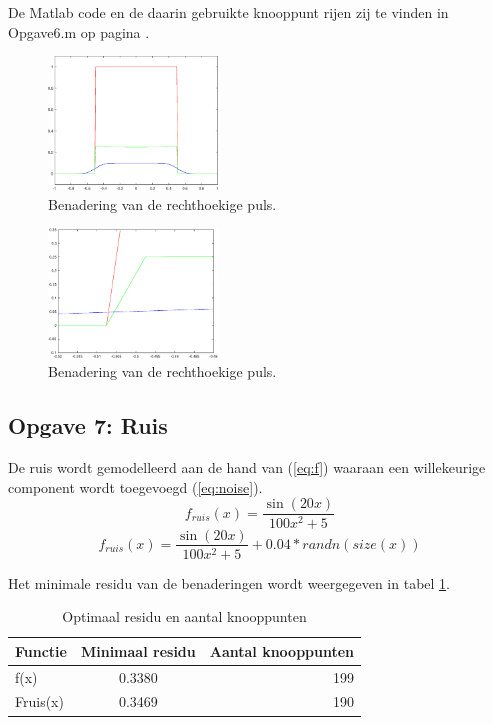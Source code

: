 \documentclass[a4paper]{article}
\newcommand{\opgave}[1]{\subsection{Opgave #1}}
\begin{document}
De Matlab code en de daarin gebruikte knooppunt rijen zij te vinden in Opgave6.m op pagina \pageref{sec:code6}.
\begin{figure}[H]
	\begin{center} 
		\includegraphics[width=0.4\textwidth]{Rectan.eps}
	\end{center}
	\caption{Benadering van de rechthoekige puls.}
	\label{fig:rectan}
\end{figure}

\begin{figure}[H]
	\begin{center} 
		\includegraphics[width=0.4\textwidth]{RectanZoom.eps}
	\end{center}
	\caption{Benadering van de rechthoekige puls.}
	\label{fig:rectanZoom}
\end{figure}
\newpage

\opgave{7: Ruis}\label{sec:oef7}
De ruis wordt gemodelleerd aan de hand van (\ref{eq:f}) waaraan een willekeurige component wordt toegevoegd (\ref{eq:noise}).
\begin{equation}\label{eq:f}
	f_{ruis}(x) = \frac{\sin{(20x)}}{100x^2+5}
\end{equation}
\begin{equation}\label{eq:noise}
	f_{ruis}(x) = \frac{\sin{(20x)}}{100x^2+5} + 0.04*randn(size(x))
\end{equation}

Het minimale residu van de benaderingen wordt weergegeven in tabel \ref{tab:splineError}.
\begin{table}[H]
	\centering
	\begin{tabular}{l c r}
		Functie & Minimaal residu & Aantal knooppunten \\ \hline
		f(x) & 0.3380 & 199 \\
		Fruis(x) & 0.3469 & 190 \\
	\end{tabular}
	\caption{Optimaal residu en aantal knooppunten}
	\label{tab:splineError}
\end{table}
\end{document}
